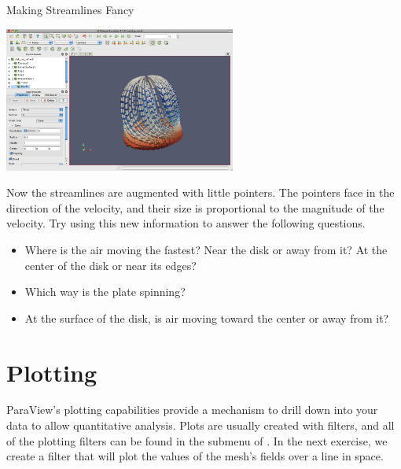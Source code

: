 \begin{exercise}{Making Streamlines Fancy}
  \begin{inlinefig}
    \includegraphics[width=3in]{images/StreamTracer2}
  \end{inlinefig}

  Now the streamlines are augmented with little pointers.  The pointers
  face in the direction of the velocity, and their size is proportional to
  the magnitude of the velocity.  Try using this new information to answer
  the following questions.

  \begin{itemize}
  \item Where is the air moving the fastest?  Near the disk or away from it?
    At the center of the disk or near its edges?
  \item Which way is the plate spinning?
  \item At the surface of the disk, is air moving toward the center or away
    from it?
  \end{itemize}
\end{exercise}


\section{Plotting}

ParaView's plotting capabilities provide a mechanism to drill down into
your data to allow quantitative analysis.  Plots are usually created with
filters, and all of the plotting filters can be found in the  submenu of .  In the next exercise, we create a
filter that will plot the values of the mesh’s fields over a line in space.

